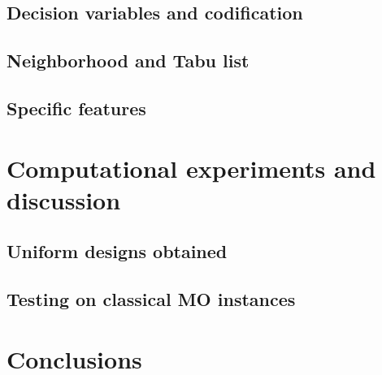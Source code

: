 \documentclass[a4paper,10pt]{llncs}
\begin{document}
\subsection{Decision variables and codification}


\subsection{Neighborhood and Tabu list}


\subsection{Specific features}


\section{Computational experiments and discussion}

\subsection{Uniform designs obtained}


\subsection{Testing on classical MO instances}


\section{Conclusions}




\end{document}

